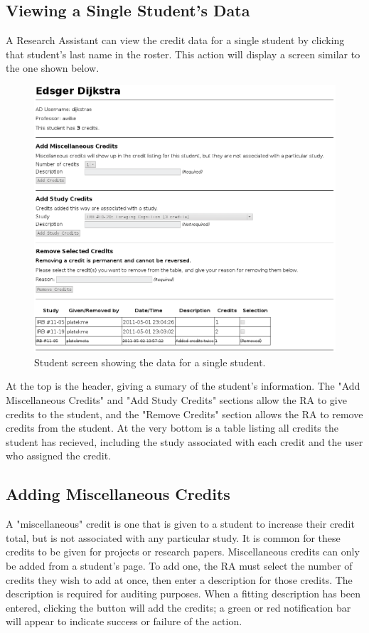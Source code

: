 \documentclass[letterpaper,titlepage]{article}
\begin{document}
\newpage
\subsection{Viewing a Single Student's Data}
A Research Assistant can view the credit data for a single student by clicking that student's last name in the roster. This action will display a screen similar to the one shown below.

\begin{figure}[H]
\includegraphics[width=\textwidth]{images/ra_view-student.png}
\caption{Student screen showing the data for a single student.}
\label{ra_view-student}
\end{figure}

At the top is the header, giving a sumary of the student's information. The "Add Miscellaneous Credits" and "Add Study Credits" sections allow the RA to give credits to the student, and the "Remove Credits" section allows the RA to remove credits from the student. At the very bottom is a table listing all credits the student has recieved, including the study associated with each credit and the user who assigned the credit.

\subsection{Adding Miscellaneous Credits}
A "miscellaneous" credit is one that is given to a student to increase their credit total, but is not associated with any particular study. It is common for these credits to be given for projects or research papers. Miscellaneous credits can only be added from a student's page. To add one, the RA must select the number of credits they wish to add at once, then enter a description for those credits. The description is required for auditing purposes. When a fitting description has been entered, clicking the button will add the credits; a green or red notification bar will appear to indicate success or failure of the action.
\end{document}
